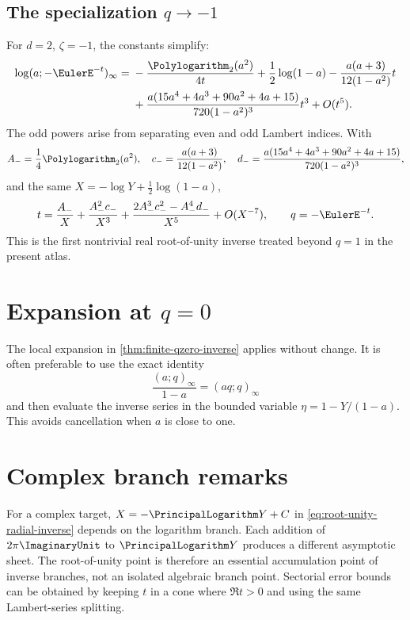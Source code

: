 \documentclass[11pt,a4paper,oneside,openany]{book}
\theoremstyle{definition}
\theoremstyle{remark}
\begin{document}
\subsection{The specialization \texorpdfstring{$q\to-1$}{q to -1}}

For \(d=2\), \(\zeta=-1\), the constants simplify:
\begin{align}
 \log(a;-\EulerE^{-t})_\infty
 ={}&-\frac{\Polylogarithm_2(a^2)}{4t}+\frac12\log(1-a)
 -\frac{a(a+3)}{12(1-a^2)}t\notag\\
 &+\frac{a(15a^4+4a^3+90a^2+4a+15)}
 {720(1-a^2)^3}t^3+O(t^5).
\label{eq:qminusone-forward}
\end{align}
The odd powers arise from separating even and odd Lambert indices.  With
\[
 A_-=\frac14\Polylogarithm_2(a^2),\quad
 c_-=\frac{a(a+3)}{12(1-a^2)},\quad
 d_-=\frac{a(15a^4+4a^3+90a^2+4a+15)}{720(1-a^2)^3},
\]
and the same \(X=-\log Y+\tfrac12\log(1-a)\),
\begin{equation}\label{eq:qminusone-inverse}
 t=\frac{A_-}{X}+\frac{A_-^2c_-}{X^3}
 +\frac{2A_-^3c_-^2-A_-^4d_-}{X^5}+O(X^{-7}),
 \qquad q=-\EulerE^{-t}.
\end{equation}
This is the first nontrivial real root-of-unity inverse treated beyond
\(q=1\) in the present atlas.

\section{Expansion at \texorpdfstring{$q=0$}{q=0}}

The local expansion in \cref{thm:finite-qzero-inverse} applies without
change.  It is often preferable to use the exact identity
\[
 \frac{(a;q)_\infty}{1-a}=(aq;q)_\infty
\]
and then evaluate the inverse series in the bounded variable
\(\eta=1-Y/(1-a)\).  This avoids cancellation when \(a\) is close to one.

\section{Complex branch remarks}

For a complex target, \(X=-\PrincipalLogarithm Y+C\) in
\eqref{eq:root-unity-radial-inverse} depends on the logarithm branch.  Each
addition of \(2\pi\ImaginaryUnit\) to \(\PrincipalLogarithm Y\) produces a different asymptotic sheet.
The root-of-unity point is therefore an essential accumulation point of
inverse branches, not an isolated algebraic branch point.  Sectorial error
bounds can be obtained by keeping \(t\) in a cone where
\(\Re t>0\) and using the same Lambert-series splitting.
\end{document}
